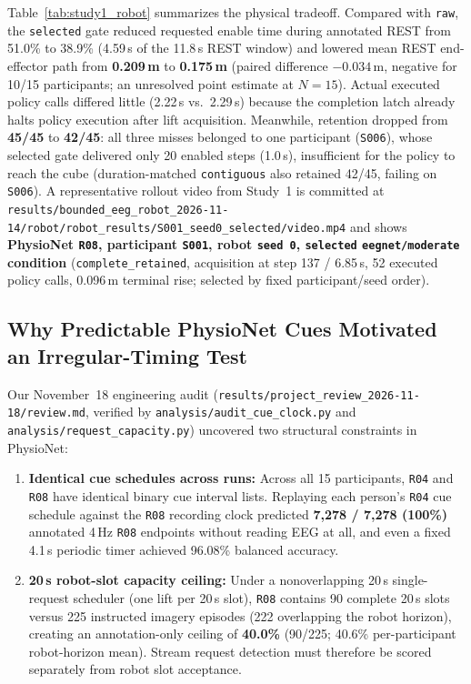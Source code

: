 \documentclass{article}
\begin{document}
Table~\ref{tab:study1_robot} summarizes the physical tradeoff. Compared with \texttt{raw}, the \texttt{selected} gate reduced requested enable time during annotated REST from 51.0\% to 38.9\% (4.59\,s of the 11.8\,s REST window) and lowered mean REST end-effector path from \textbf{0.209\,m} to \textbf{0.175\,m} (paired difference $-0.034$\,m, negative for 10/15 participants; an unresolved point estimate at $N=15$). Actual executed policy calls differed little (2.22\,s vs.\ 2.29\,s) because the completion latch already halts policy execution after lift acquisition. Meanwhile, retention dropped from \textbf{45/45} to \textbf{42/45}: all three misses belonged to one participant (\texttt{S006}), whose selected gate delivered only 20 enabled steps (1.0\,s), insufficient for the policy to reach the cube (duration-matched \texttt{contiguous} also retained 42/45, failing on \texttt{S006}). A representative rollout video from Study~1 is committed at \texttt{results/\allowbreak bounded\_eeg\_robot\_2026-11-14/\allowbreak robot/\allowbreak robot\_results/\allowbreak S001\_seed0\_selected/\allowbreak video.mp4} and shows \textbf{PhysioNet \texttt{R08}, participant \texttt{S001}, robot \texttt{seed~0}, \texttt{selected} \texttt{eegnet/moderate} condition} (\texttt{complete\_retained}, acquisition at step 137 / 6.85\,s, 52 executed policy calls, 0.096\,m terminal rise; selected by fixed participant/seed order).

\subsection{Why Predictable PhysioNet Cues Motivated an Irregular-Timing Test}

Our November~18 engineering audit (\texttt{results/project\_review\_2026-11-18/review.md}, verified by \texttt{analysis/audit\_cue\_clock.py} and \texttt{analysis/request\_capacity.py}) uncovered two structural constraints in PhysioNet:
\begin{enumerate}
  \item \textbf{Identical cue schedules across runs:} Across all 15 participants, \texttt{R04} and \texttt{R08} have identical binary cue interval lists. Replaying each person's \texttt{R04} cue schedule against the \texttt{R08} recording clock predicted \textbf{7,278 / 7,278 (100\%)} annotated 4\,Hz \texttt{R08} endpoints without reading EEG at all, and even a fixed 4.1\,s periodic timer achieved 96.08\% balanced accuracy.
  \item \textbf{20\,s robot-slot capacity ceiling:} Under a nonoverlapping 20\,s single-request scheduler (one lift per 20\,s slot), \texttt{R08} contains 90 complete 20\,s slots versus 225 instructed imagery episodes (222 overlapping the robot horizon), creating an annotation-only ceiling of \textbf{40.0\%} (90/225; 40.6\% per-participant robot-horizon mean). Stream request detection must therefore be scored separately from robot slot acceptance.
\end{enumerate}
\end{document}
